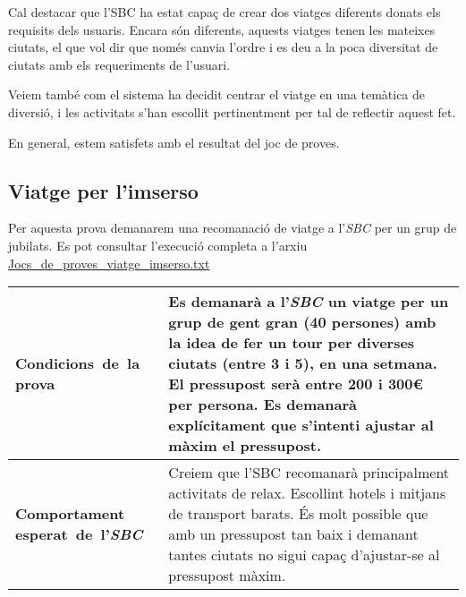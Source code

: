 \documentclass[11pt,a4paper]{article}
\begin{document}
\medskip

Cal destacar que l'SBC ha estat capaç de crear dos viatges diferents donats els requisits dels usuaris. Encara són diferents, aquests viatges tenen les mateixes ciutats, el que vol dir que només canvia l'ordre i es deu a la poca diversitat de ciutats amb els requeriments de l'usuari.

Veiem també com el sistema ha decidit centrar el viatge en una temàtica de diversió, i les activitats s'han escollit pertinentment per tal de reflectir aquest fet.

En general, estem satisfets amb el resultat del joc de proves.

\subsection{Viatge per l'imserso}
Per aquesta prova demanarem una recomanació de viatge a l'\emph{SBC} per un grup de jubilats. Es pot consultar l'execució completa a l'arxiu \url{Jocs_de_proves_viatge_imserso.txt} \\

\noindent
\begin{tabular}{|p{}|p{}|}
\hline
\textbf{\mbox{Condicions de la} \mbox{prova}} & Es demanarà a l'\emph{SBC} un viatge per un grup de gent gran (40 persones) amb la idea de fer un tour per diverses ciutats (entre 3 i 5), en una setmana. El pressupost serà entre 200 i 300\euro{} per persona. Es demanarà explícitament que s'intenti ajustar al màxim el pressupost.\\
\hline
\textbf{Comportament \mbox{esperat de l'\emph{SBC}}} & Creiem que l'SBC recomanarà principalment activitats de relax. Escollint hotels i mitjans de transport barats. És molt possible que amb un pressupost tan baix i demanant tantes ciutats no sigui capaç d'ajustar-se al pressupost màxim.\\
\hline
\end{tabular}
\bigskip
\end{document}
